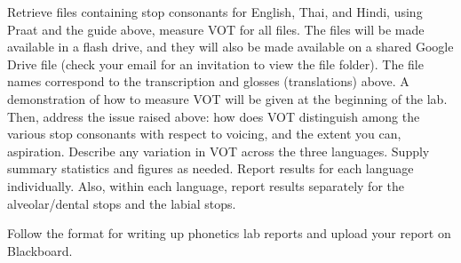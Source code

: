 \documentclass[lab={2},title={Voice Onset Time}]{com310lab}
\begin{document}
\begin{task}
	Retrieve files containing stop consonants for English, Thai, and Hindi, using Praat and the guide above, measure VOT for all files.
	The files will be made available in a flash drive, and they will also be made available on a shared Google Drive file (check your email for an invitation to view the file folder).
	The file names correspond to the transcription and glosses (translations) above.
	A demonstration of how to measure VOT will be given at the beginning of the lab.\\

	Then, address the issue raised above: how does VOT distinguish among the various stop consonants with respect to voicing, and the extent you can, aspiration.
	Describe any variation in VOT across the three languages.
	Supply summary statistics and figures as needed.
	Report results for each language individually.
	Also, within each language, report results separately for the alveolar/dental stops and the labial stops.
\end{task}

\begin{writeup}
	Follow the format for writing up phonetics lab reports and upload your report on Blackboard.
\end{writeup}

\pagebreak

\labtitle

\begin{topic}
	\\
\end{topic}

\begin{issue}
	\\
\end{issue}

\begin{hypothesis}
	\\
\end{hypothesis}

\begin{method}
	\\
\end{method}

\begin{results}
	\\
\end{results}

\begin{discussion}
	\\
\end{discussion}
\end{document}
